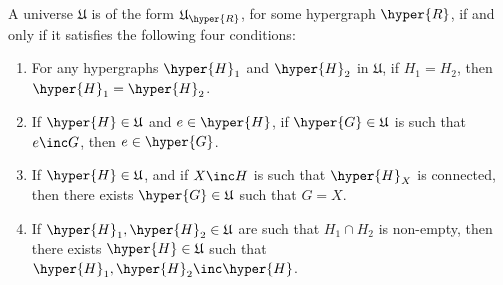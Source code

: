 \begin{proposition}  \label{restrictohedra-characterisation}
A universe $\mathfrak{U}$ is of the form $\mathfrak{U}_{\hyper{R}}$, for some hypergraph $\hyper{R}$, if and only if it satisfies the  following four conditions:

\begin{enumerate}
\item
For any hypergraphs $\hyper{H}_1$ and $\hyper{H}_2$ in $\mathfrak{U}$, if $H_1=H_2$, then $\hyper{H}_1=\hyper{H}_2$.
\item  
If $\hyper{H}\in\mathfrak{U}$ and $e\in\hyper{H}$, if  $\hyper{G}\in\mathfrak{U}$ is such that $e\inc G$, then $e\in\hyper{G}$.

\item
If  $\hyper{H}\in\mathfrak{U}$, and if  $X \inc H$ is such that $\hyper{H}_X$ is connected, then there exists $\hyper{G}\in \mathfrak{U}$ such that $G=X$.

\item
If $\hyper{H}_1,\hyper{H}_2\in \mathfrak{U}$ are such that $H_1 \cap H_2$ is non-empty, then there exists $\hyper{H}\in \mathfrak{U}$  such that  $\hyper{H}_1,\hyper{H}_2\inc\hyper{H}$. 
\end{enumerate}
\end{proposition}
